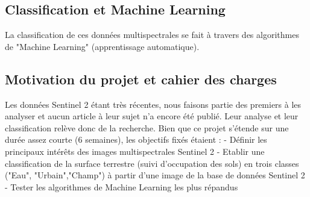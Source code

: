 \subsection{Classification et Machine Learning}

La classification de ces données multispectrales se fait à travers des algorithmes de "Machine Learning" (apprentissage automatique). 

\subsection{Motivation du projet et cahier des charges}

Les données Sentinel 2 étant très récentes, nous faisons partie des premiers à les analyser et aucun article à leur sujet n'a encore été publié. Leur analyse et leur classification relève donc de la recherche. 
Bien que ce projet s'étende sur une durée assez courte (6 semaines), les objectifs fixés étaient :
  - Définir les principaux intérêts des images multispectrales Sentinel 2
  - Etablir une classification de la surface terrestre (suivi d'occupation des sols) en trois classes ("Eau", "Urbain","Champ") à partir d'une image de la base de données Sentinel 2
  - Tester les algorithmes de Machine Learning les plus répandus
 
